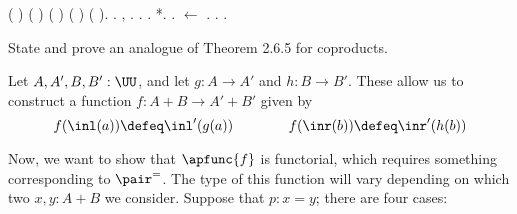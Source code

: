 \begin{coqdoccode}
\coqdocindent{1.00em}
  (     ) \coqdocnotation{=}   ( ) ( ) (  ) (   ).\coqdoceol
\coqdocnoindent
{}.  , .\coqdoceol
\coqdocnoindent
{} .  .   *.  .  \ensuremath{\leftarrow} . .\coqdoceol
\coqdocnoindent
{}.\coqdoceol
\coqdocemptyline
\end{coqdoccode}
State and prove an analogue of Theorem 2.6.5 for coproducts.


 \soln
Let $A, A', B, B' : \UU$, and let $g: A \to A'$ and $h: B \to B'$.  These allow
us to construct a function $f : A + B \to A' + B'$ given by
\[
  f(\inl(a)) \defeq \inl'(g(a))
  \qquad\qquad
  f(\inr(b)) \defeq \inr'(h(b))
\]


Now, we want to show that $\apfunc{f}$ is functorial, which requires something
corresponding to $\pair^{=}$.  The type of this function will vary depending on
which two $x, y : A+B$ we consider. Suppose that $p : x = y$; there are four
cases:



